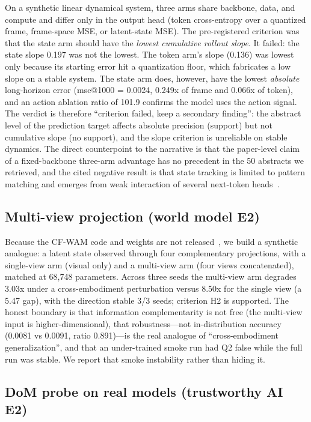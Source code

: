 On a synthetic linear dynamical system, three arms share backbone, data, and
compute and differ only in the output head (token cross-entropy over a
quantized frame, frame-space MSE, or latent-state MSE). The pre-registered
criterion was that the state arm should have the \emph{lowest cumulative
rollout slope}. It failed: the state slope 0.197 was not the lowest. The token
arm's slope (0.136) was lowest only because its starting error hit a quantization
floor, which fabricates a low slope on a stable system. The state arm does,
however, have the lowest \emph{absolute} long-horizon error (mse@1000 =
0.0024, 0.249x of frame and 0.066x of token), and an action ablation ratio of
101.9 confirms the model uses the action signal. The verdict is therefore
``criterion failed, keep a secondary finding'': the abstract level of the
prediction target affects absolute precision (support) but not cumulative slope
(no support), and the slope criterion is unreliable on stable dynamics. The
direct counterpoint to the narrative is that the paper-level claim of a
fixed-backbone three-arm advantage has no precedent in the 50 abstracts we
retrieved, and the cited negative result is that state tracking is limited to
pattern matching and emerges from weak interaction of several next-token
heads~\cite{statelaws2025}.

\subsection{Multi-view projection (world model E2)}

Because the CF-WAM code and weights are not released~\cite{wam2026}, we build a
synthetic analogue: a latent state observed through four complementary
projections, with a single-view arm (visual only) and a multi-view arm (four
views concatenated), matched at 68{,}748 parameters. Across three seeds the
multi-view arm degrades 3.03x under a cross-embodiment perturbation versus
8.50x for the single view (a 5.47 gap), with the direction stable 3/3 seeds;
criterion H2 is supported. The honest boundary is that information complementarity
is not free (the multi-view input is higher-dimensional), that robustness---not
in-distribution accuracy (0.0081 vs 0.0091, ratio 0.891)---is the real analogue
of ``cross-embodiment generalization'', and that an under-trained smoke run had
Q2 false while the full run was stable. We report that smoke instability rather
than hiding it.

\subsection{DoM probe on real models (trustworthy AI E2)}

